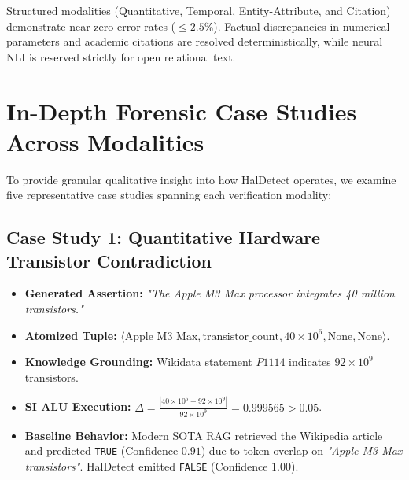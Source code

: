 Structured modalities (Quantitative, Temporal, Entity-Attribute, and Citation) demonstrate near-zero error rates ($\le 2.5\%$). Factual discrepancies in numerical parameters and academic citations are resolved deterministically, while neural NLI is reserved strictly for open relational text.

\section{In-Depth Forensic Case Studies Across Modalities}
\label{sec:forensic_case_studies}

To provide granular qualitative insight into how HalDetect operates, we examine five representative case studies spanning each verification modality:

\subsection{Case Study 1: Quantitative Hardware Transistor Contradiction}
\begin{itemize}
    \item \textbf{Generated Assertion:} \textit{"The Apple M3 Max processor integrates 40 million transistors."}
    \item \textbf{Atomized Tuple:} $\langle \text{Apple M3 Max}, \text{transistor\_count}, 40\times 10^6, \text{None}, \text{None} \rangle$.
    \item \textbf{Knowledge Grounding:} Wikidata statement $P1114$ indicates $92\times 10^9$ transistors.
    \item \textbf{SI ALU Execution:} $\Delta = \frac{|40\times 10^6 - 92\times 10^9|}{92\times 10^9} = 0.999565 > 0.05$.
    \item \textbf{Baseline Behavior:} Modern SOTA RAG retrieved the Wikipedia article and predicted \texttt{TRUE} (Confidence $0.91$) due to token overlap on \textit{"Apple M3 Max transistors"}. HalDetect emitted \texttt{FALSE} (Confidence $1.00$).
\end{itemize}

